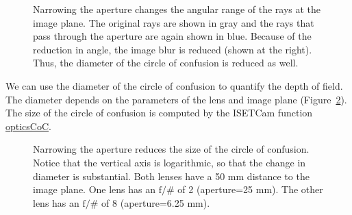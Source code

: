 \documentclass[
  letterpaper,
]{book}
\begin{document}
\begin{figure}


\caption{\label{fig-optics-coc2}Narrowing the aperture changes the
angular range of the rays at the image plane. The original rays are
shown in gray and the rays that pass through the aperture are again
shown in blue. Because of the reduction in angle, the image blur is
reduced (shown at the right). Thus, the diameter of the circle of
confusion is reduced as well.}

\end{figure}%

We can use the diameter of the circle of confusion to quantify the depth
of field. The diameter depends on the parameters of the lens and image
plane (Figure~\ref{fig-optics-coc3}). The size of the circle of
confusion is computed by the ISETCam function
\href{https://github.com/iset/ISETCam/blob/main/opticalimage/optics/opticsCoC.m}{opticsCoC}.

\begin{figure}


\caption{\label{fig-optics-coc3}Narrowing the aperture reduces the size
of the circle of confusion. Notice that the vertical axis is
logarithmic, so that the change in diameter is substantial. Both lenses
have a 50 mm distance to the image plane. One lens has an
\(\mathrm{f}/\#\) of 2 (aperture=25 mm). The other lens has an
\(\mathrm{f}/\#\) of 8 (aperture=6.25 mm).}

\end{figure}%
\end{document}
